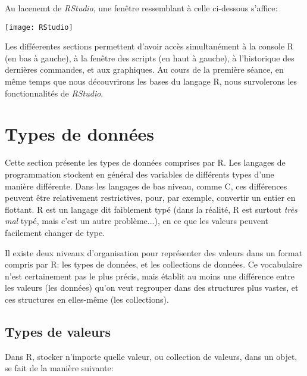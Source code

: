 Au lacenemt de \emph{RStudio}, une fenêtre ressemblant à celle ci-dessous s'affice:

\begin{center}
\texttt{[image: RStudio]}
\end{center}

Les difféerentes sections permettent d'avoir accès simultanément à la console R (en bas à gauche), à la fenêtre des scripts (en haut à gauche), à l'historique des dernières commandes, et aux graphiques.
Au cours de la première séance, en même temps que nous découvrirons les bases du langage R, nous survolerons les fonctionnalités de \emph{RStudio}.

\section{Types de données}

Cette section présente les types de données comprises par R.
Les langages de programmation stockent en général des variables de différents types d'une manière différente.
Dans les langages de bas niveau, comme C, ces différences peuvent être relativement restrictives, pour, par exemple, convertir un entier en flottant.
R est un langage dit faiblement typé (dans la réalité, R est surtout \emph{très mal} typé, mais c'est un autre problème...), en ce que les valeurs peuvent facilement changer de type.


Il existe deux niveaux d'organisation pour représenter des valeurs dans un format compris par R: les types de données, et les collections de données.
Ce vocabulaire n'est certainement pas le plus précis, mais établit au moins une différence entre les valeurs (les données) qu'on veut regrouper dans des structures plus vastes, et ces structures en elles-même (les collections).

\subsection{Types de valeurs}

Dans R, stocker n'importe quelle valeur, ou collection de valeurs, dans un objet, se fait de la manière suivante:

\begin{knitrout}
\color{fgcolor}\begin{kframe}
\begin{flushleft}
\ttfamily\noindent
{}\hlassignement{\usebox{\hlnormalsizeboxlessthan}-}{\ }\mbox{}
\normalfont
\end{flushleft}
\end{kframe}
\end{knitrout}


